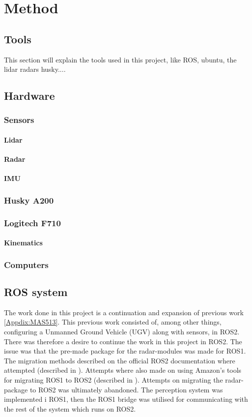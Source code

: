 \chapter{Method}
\section{Tools}
This section will explain the tools used in this project, like ROS, ubuntu, the lidar radars husky....

\section{Hardware}
\subsection{Sensors}
\subsubsection{Lidar}

\subsubsection{Radar}
\subsubsection{IMU}
\subsection{Husky A200}
\subsection{Logitech F710}
\subsubsection{Kinematics}
\subsection{Computers}

\section{ROS system}
The work done in this project is a continuation and expansion of previous work \ref{Appdix:MAS513}. This previous work consisted of, among other things, configuring a Unmanned Ground Vehicle (UGV) along with sensors, in ROS2. There was therefore a desire to continue the work in this project in ROS2. The issue was that the pre-made package for the radar-modules was made for ROS1. The migration methods described on the official ROS2 documentation where attempted (described in \cite{ROSMigrationGuide}). Attempts where also made on using Amazon's tools for migrating ROS1 to ROS2 (described in \cite{ROSMigrationGuide}). Attempts on migrating the radar-package to ROS2 was ultimately abandoned. The perception system was implemented i ROS1, then the ROS1 bridge was utilised for communicating with the rest of the system which runs on ROS2.

